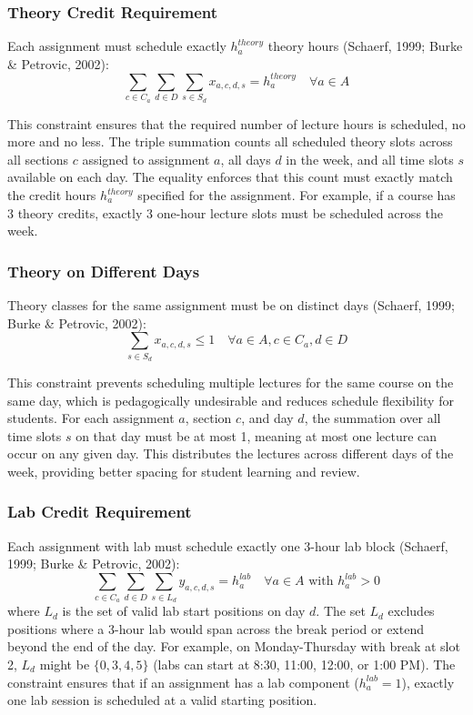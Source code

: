 \documentclass[12pt,a4paper]{article}
\begin{document}
\subsubsection{Theory Credit Requirement}

Each assignment must schedule exactly $h_a^{theory}$ theory hours (Schaerf, 1999; Burke \& Petrovic, 2002):
\begin{equation}
\sum_{c \in C_a} \sum_{d \in D} \sum_{s \in S_d} x_{a,c,d,s} = h_a^{theory} \quad \forall a \in A
\end{equation}

This constraint ensures that the required number of lecture hours is scheduled, no more and no less. The triple summation counts all scheduled theory slots across all sections $c$ assigned to assignment $a$, all days $d$ in the week, and all time slots $s$ available on each day. The equality enforces that this count must exactly match the credit hours $h_a^{theory}$ specified for the assignment. For example, if a course has 3 theory credits, exactly 3 one-hour lecture slots must be scheduled across the week.

\subsubsection{Theory on Different Days}

Theory classes for the same assignment must be on distinct days (Schaerf, 1999; Burke \& Petrovic, 2002):
\begin{equation}
\sum_{s \in S_d} x_{a,c,d,s} \leq 1 \quad \forall a \in A, c \in C_a, d \in D
\end{equation}

This constraint prevents scheduling multiple lectures for the same course on the same day, which is pedagogically undesirable and reduces schedule flexibility for students. For each assignment $a$, section $c$, and day $d$, the summation over all time slots $s$ on that day must be at most 1, meaning at most one lecture can occur on any given day. This distributes the lectures across different days of the week, providing better spacing for student learning and review.

\subsubsection{Lab Credit Requirement}

Each assignment with lab must schedule exactly one 3-hour lab block (Schaerf, 1999; Burke \& Petrovic, 2002):
\begin{equation}
\sum_{c \in C_a} \sum_{d \in D} \sum_{s \in L_d} y_{a,c,d,s} = h_a^{lab} \quad \forall a \in A \text{ with } h_a^{lab} > 0
\end{equation}
where $L_d$ is the set of valid lab start positions on day $d$. The set $L_d$ excludes positions where a 3-hour lab would span across the break period or extend beyond the end of the day. For example, on Monday-Thursday with break at slot 2, $L_d$ might be $\{0, 3, 4, 5\}$ (labs can start at 8:30, 11:00, 12:00, or 1:00 PM). The constraint ensures that if an assignment has a lab component ($h_a^{lab} = 1$), exactly one lab session is scheduled at a valid starting position.
\end{document}
